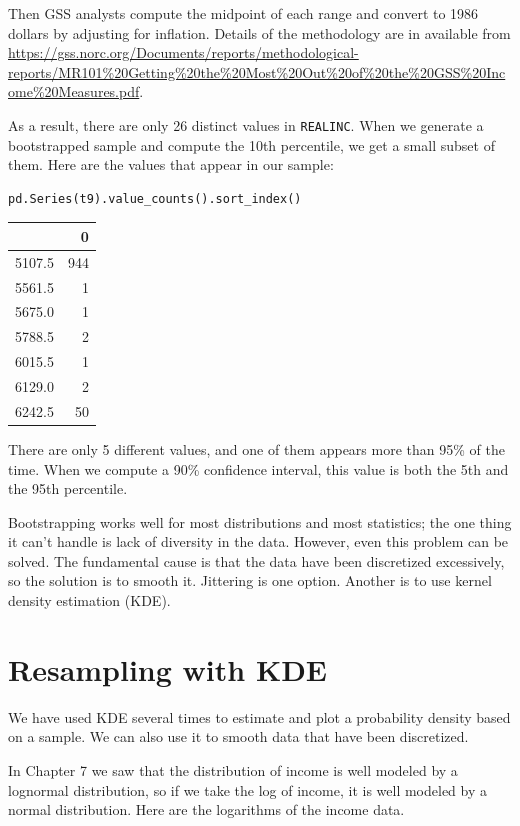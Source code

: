 Then GSS analysts compute the midpoint of each range and convert to 1986
dollars by adjusting for inflation. Details of the methodology are in
available from
\url{https://gss.norc.org/Documents/reports/methodological-reports/MR101\%20Getting\%20the\%20Most\%20Out\%20of\%20the\%20GSS\%20Income\%20Measures.pdf}.

As a result, there are only 26 distinct values in
\passthrough{\lstinline!REALINC!}. When we generate a bootstrapped
sample and compute the 10th percentile, we get a small subset of them.
Here are the values that appear in our sample:

\begin{lstlisting}[language=Python]
pd.Series(t9).value_counts().sort_index()
\end{lstlisting}

\begin{tabular}{lr}
\toprule
{} &    0 \\
\midrule
5107.5 &  944 \\
5561.5 &    1 \\
5675.0 &    1 \\
5788.5 &    2 \\
6015.5 &    1 \\
6129.0 &    2 \\
6242.5 &   50 \\
\bottomrule
\end{tabular}

There are only 5 different values, and one of them appears more than
95\% of the time. When we compute a 90\% confidence interval, this value
is both the 5th and the 95th percentile.

Bootstrapping works well for most distributions and most statistics; the
one thing it can't handle is lack of diversity in the data. However,
even this problem can be solved. The fundamental cause is that the data
have been discretized excessively, so the solution is to smooth it.
Jittering is one option. Another is to use kernel density estimation
(KDE).

\hypertarget{resampling-with-kde}{%
\section{Resampling with KDE}\label{resampling-with-kde}}

We have used KDE several times to estimate and plot a probability
density based on a sample. We can also use it to smooth data that have
been discretized.

In Chapter 7 we saw that the distribution of income is well modeled by a
lognormal distribution, so if we take the log of income, it is well
modeled by a normal distribution. Here are the logarithms of the income
data.

